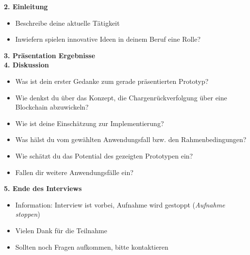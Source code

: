 \noindent
\textbf{2. Einleitung}
\begin{itemize}
  \item Beschreibe deine aktuelle Tätigkeit
  \item Inwiefern spielen innovative Ideen in deinem Beruf eine Rolle?
\end{itemize}

\noindent
\textbf{3. Präsentation Ergebnisse}\\
\noindent
\textbf{4. Diskussion}
\begin{itemize}
  \item Was ist dein erster Gedanke zum gerade präsentierten Prototyp?
  \item Wie denkst du über das Konzept, die Chargenrückverfolgung über eine Blockchain abzuwickeln?
  \item Wie ist deine Einschätzung zur Implementierung?
  \item Was hälst du vom gewählten Anwendungsfall bzw. den Rahmenbedingungen?
  \item Wie schätzt du das Potential des gezeigten Prototypen ein?
  \item Fallen dir weitere Anwendungsfälle ein?
\end{itemize}

\noindent
\textbf{5. Ende des Interviews}
\begin{itemize}
  \item Information: Interview ist vorbei, Aufnahme wird gestoppt (\textit{Aufnahme stoppen})
  \item Vielen Dank für die Teilnahme
  \item Sollten noch Fragen aufkommen, bitte kontaktieren
\end{itemize}
\normalsize

\newpage
